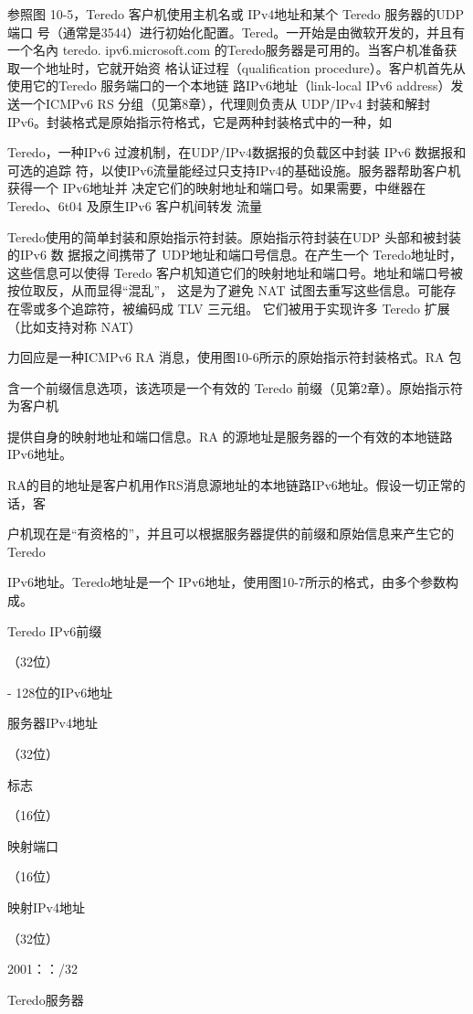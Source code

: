 参照图 10-5，Teredo 客户机使用主机名或 IPv4地址和某个 Teredo 服务器的UDP 端口
号（通常是3544）进行初始化配置。Tered。一开始是由微软开发的，并且有一个名內 teredo.
ipv6.microsoft.com 的Teredo服务器是可用的。当客户机准备获取一个地址时，它就开始资
格认证过程（qualification procedure）。客户机首先从使用它的Teredo 服务端口的一个本地链
路IPv6地址（link-local IPv6 address）发送一个ICMPv6 RS 分组（见第8章），代理则负责从
UDP/IPv4 封装和解封IPv6。封装格式是原始指示符格式，它是两种封装格式中的一种，如

Teredo，一种IPv6 过渡机制，在UDP/IPv4数据报的负载区中封装 IPv6 数据报和可选的追踪
符，以使IPv6流量能经过只支持IPv4的基础设施。服务器帮助客户机获得一个 IPv6地址并
决定它们的映射地址和端口号。如果需要，中继器在 Teredo、6t04 及原生IPv6 客户机间转发
流量

Teredo使用的简单封装和原始指示符封装。原始指示符封装在UDP 头部和被封装的IPv6 数
据报之间携带了 UDP地址和端口号信息。在产生一个 Teredo地址时，这些信息可以使得
Teredo 客户机知道它们的映射地址和端口号。地址和端口号被按位取反，从而显得“混乱”，
这是为了避免 NAT 试图去重写这些信息。可能存在零或多个追踪符，被编码成 TLV 三元组。
它们被用于实现许多 Teredo 扩展（比如支持对称 NAT）

力回应是一种ICMPv6 RA 消息，使用图10-6所示的原始指示符封装格式。RA 包

含一个前缀信息选项，该选项是一个有效的 Teredo 前缀（见第2章）。原始指示符为客户机

提供自身的映射地址和端口信息。RA 的源地址是服务器的一个有效的本地链路IPv6地址。

RA的目的地址是客户机用作RS消息源地址的本地链路IPv6地址。假设一切正常的话，客

户机现在是“有资格的”，并且可以根据服务器提供的前缀和原始信息来产生它的Teredo

IPv6地址。Teredo地址是一个 IPv6地址，使用图10-7所示的格式，由多个参数构成。

Teredo IPv6前缀

（32位）

- 128位的IPv6地址

服务器IPv4地址

（32位）

标志

（16位）

映射端口

（16位）

映射IPv4地址

（32位）

2001：：/32

Teredo服务器

